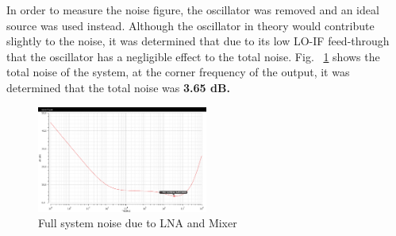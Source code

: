 In order to measure the noise figure, the oscillator was removed and an ideal source was used instead. Although the oscillator in theory would contribute slightly to the noise, it was determined that due to its low LO-IF feed-through that the oscillator has a negligible effect to the total noise. Fig. ~\ref{fig:fullsystemnoise} shows the total noise of the system, at the corner frequency of the output, it was determined that the total noise was \bf{3.65 dB}.

\begin{figure}[h]
   \centering
    \includegraphics[width=0.5\textwidth]{figures/FullSysNoiseFigure.png}
    \caption{Full system noise due to LNA and Mixer }
    \label{fig:fullsystemnoise}
\end{figure}